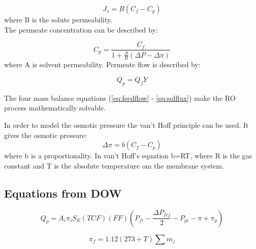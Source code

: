 \begin{equation}
\label{eq:solflux}
J_{s}=B(C_{f}- C_{p})
\end{equation}
 where B is the solute permeability.
\\The permeate concentration can be described by:

\begin{equation}
\label{eq:permcond}
C_{p}=\frac{C_{f}}{1+\frac{A}{B}(\Delta P - \Delta\pi)}
\end{equation}
where A is solvent permeability.
Permeate flow is described by:

\begin{equation}
\label{eq:permflow}
Q_{p}=Q_{f}Y
\end{equation}

The four mass balance equations (\ref{eq:feedflow} - \ref{eq:solflux}) make the RO process mathematically solvable.

In order to model the osmotic pressure the van't Hoff principle can be used. It gives the osmotic pressure:
\begin{equation}
\label{eq:posm}
\Delta\pi=b(C_{f}-C_{p})
\end{equation}
where b is a proportionality. In van't Hoff's equation b=RT, where R is the gas constant and T is the absolute temperature om the membrane system. 

\subsection{Equations from DOW}
\label{sec:doweq}
\mathleft

\begin{equation}
\label{eq:pQ}
Q_{p}=A_{i}\pi_{i} S_{E}(TCF)(FF)(P_{fi}-\frac{\Delta P_{fcj}}{2}-P_{pi}-\pi+\pi_{p})
\end{equation}



\begin{equation}
\label{eq:feedOsmP}
\pi_{f}= 1.12(273+T) \sum m_{j}
\end{equation}


